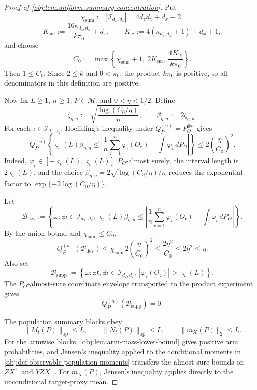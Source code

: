\documentclass[11pt]{article}
\begin{document}
\begin{proof}[Proof of \cref{obj:lem:uniform-summary-concentration}]
Put
\[
\chi_{\mathrm{sum}}:=|\mathcal I_{d_x,d_z}|=4d_zd_x+d_x+2,
\]
\[
K_{\mathrm{sm}}:=\frac{16\kappa_{d_z,d_x}}{k\pi_0}+d_x,
\qquad
K_{\mathrm{lg}}:=4(\kappa_{d_z,d_x}+1)+d_x+1,
\]
and choose
\[
C_0:=
\max\left\{\chi_{\mathrm{sum}}+1,\ 2K_{\mathrm{sm}},\
\frac{4K_{\mathrm{lg}}}{k\pi_0}\right\}.
\]
Then \(1\le C_0\).  Since \(2\le k\) and \(0<\pi_0\), the product
\(k\pi_0\) is positive, so all denominators in this definition are positive.  %

Now fix \(L\ge1\), \(n\ge1\), \(P\in\mathcal M\), and
\(0<\eta<1/2\).  Define
\[
\zeta_{\eta,n}:=
\sqrt{\frac{\log(C_0/\eta)}{n}},
\qquad
\beta_{\eta,n}:=2\zeta_{\eta,n}.
\]
For each \(\iota\in\mathcal I_{d_x,d_z}\), Hoeffding's inequality under
\(Q_P^{(n)}=P_O^{\otimes n}\) gives
\[
Q_P^{(n)}
\left\{
\varsigma_\iota(L)\beta_{\eta,n}
\le
\left|
\frac1n\sum_{\mathfrak r=1}^n\varphi_\iota(O_{\mathfrak r})
-
\int \varphi_\iota\,dP_O
\right|
\right\}
\le
2\left(\frac{\eta}{C_0}\right)^2 .
\]
Indeed, \(\varphi_\iota\in[-\varsigma_\iota(L),\varsigma_\iota(L)]\)
\(P_O\)-almost surely, the interval length is \(2\varsigma_\iota(L)\), and the
choice \(\beta_{\eta,n}=2\sqrt{\log(C_0/\eta)/n}\) reduces the exponential
factor to \(\exp\{-2\log(C_0/\eta)\}\).  %

Let
\[
\mathcal B_{\mathrm{dev}}
:=
\left\{\omega:\exists\iota\in\mathcal I_{d_x,d_z},\
\varsigma_\iota(L)\beta_{\eta,n}
\le
\left|
\frac1n\sum_{\mathfrak r=1}^n\varphi_\iota(O_{\mathfrak r})
-
\int \varphi_\iota\,dP_O
\right|\right\}.
\]
By the union bound and \(\chi_{\mathrm{sum}}\le C_0\),
\[
Q_P^{(n)}(\mathcal B_{\mathrm{dev}})
\le
\chi_{\mathrm{sum}}\,2\left(\frac{\eta}{C_0}\right)^2
\le
\frac{2\eta^2}{C_0}
\le
2\eta^2
\le
\eta .
\]
Also set
\[
\mathcal B_{\mathrm{supp}}
:=
\left\{\omega:\exists \mathfrak r,\exists\iota\in\mathcal I_{d_x,d_z},\
|\varphi_\iota(O_{\mathfrak r})|>\varsigma_\iota(L)\right\}.
\]
The \(P_O\)-almost-sure coordinate envelope transported to the product
experiment gives
\[
Q_P^{(n)}(\mathcal B_{\mathrm{supp}})=0 .
\]  %

The population summary blocks obey
\[
\|M_t(P)\|_{\mathrm{op}}\le L,\qquad
\|N_t(P)\|_{\mathrm{op}}\le L,\qquad
\|m_X(P)\|_2\le L .
\]
For the armwise blocks, \cref{obj:lem:arm-mass-lower-bound} gives positive
arm probabilities, and Jensen's inequality applied to the conditional moments
in \cref{obj:def:observable-population-moments} transfers the almost-sure
bounds on \(ZX^\top\) and \(YZX^\top\).  For \(m_X(P)\), Jensen's inequality
applies directly to the unconditional target-proxy mean.  %


\end{proof}
\end{document}
